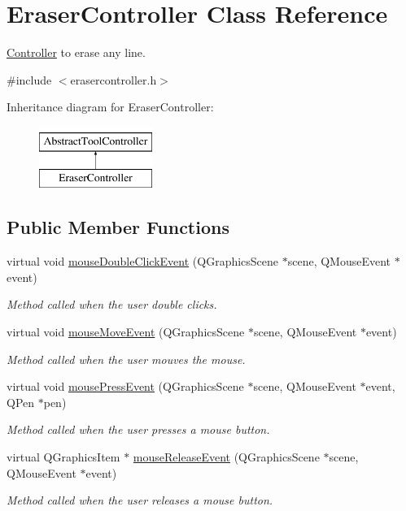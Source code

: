 \hypertarget{classEraserController}{}\section{Eraser\+Controller Class Reference}
\label{classEraserController}


\hyperlink{classController}{Controller} to erase any line.  




{\ttfamily \#include $<$erasercontroller.\+h$>$}

Inheritance diagram for Eraser\+Controller\+:\begin{figure}[H]
\begin{center}
\leavevmode
\includegraphics[height=2.000000cm]{classEraserController}
\end{center}
\end{figure}
\subsection*{Public Member Functions}
\begin{DoxyCompactItemize}
\item 
virtual void \hyperlink{classEraserController_a72507fa6319589843b988d8cc2a3dcf4}{mouse\+Double\+Click\+Event} (Q\+Graphics\+Scene $\ast$scene, Q\+Mouse\+Event $\ast$event)
\begin{DoxyCompactList}\small\item\em Method called when the user double clicks. \end{DoxyCompactList}\item 
virtual void \hyperlink{classEraserController_a51c33772287cdf511d8b9dbb21f47be2}{mouse\+Move\+Event} (Q\+Graphics\+Scene $\ast$scene, Q\+Mouse\+Event $\ast$event)
\begin{DoxyCompactList}\small\item\em Method called when the user mouves the mouse. \end{DoxyCompactList}\item 
virtual void \hyperlink{classEraserController_ad4d26f0c187a4f1ec6a49c55c3f19e9a}{mouse\+Press\+Event} (Q\+Graphics\+Scene $\ast$scene, Q\+Mouse\+Event $\ast$event, Q\+Pen $\ast$pen)
\begin{DoxyCompactList}\small\item\em Method called when the user presses a mouse button. \end{DoxyCompactList}\item 
virtual Q\+Graphics\+Item $\ast$ \hyperlink{classEraserController_a3135ed091e3e1482bd15818819bd642b}{mouse\+Release\+Event} (Q\+Graphics\+Scene $\ast$scene, Q\+Mouse\+Event $\ast$event)
\begin{DoxyCompactList}\small\item\em Method called when the user releases a mouse button. \end{DoxyCompactList}\end{DoxyCompactItemize}
